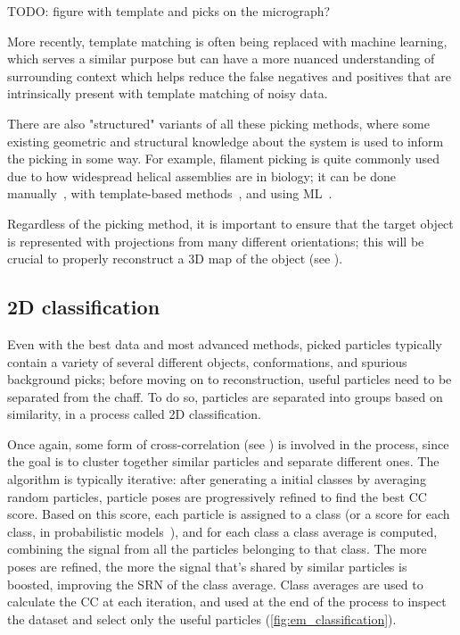 TODO: figure with template and picks on the micrograph?

More recently, template matching is often being replaced with machine learning, which serves a similar purpose but can have a more nuanced understanding of surrounding context which helps reduce the false negatives and positives that are intrinsically present with template matching of noisy data.

There are also "structured" variants of all these picking methods, where some existing geometric and structural knowledge about the system is used to inform the picking in some way.
For example, filament picking is quite commonly used due to how widespread helical assemblies are in biology; it can be done manually~\cite{scheresRELIONImplementationBayesian2012,heHelicalReconstructionRELION2017}, with template-based methods~\cite{punjaniCryoSPARCAlgorithmsRapid2017}, and using ML~\cite{wagnerSPHIREcrYOLOFastAccurate2019,wagnerEvolutionSPHIREcrYOLOParticle2020}.

Regardless of the picking method, it is important to ensure that the target object is represented with projections from many different orientations; this will be crucial to properly reconstruct a 3D map of the object (see ).

\subsection{2D classification}\label{em_classification}

Even with the best data and most advanced methods, picked particles typically contain a variety of several different objects, conformations, and spurious background picks; before moving on to reconstruction, useful particles need to be separated from the chaff.
To do so, particles are separated into groups based on similarity, in a process called 2D classification.

Once again, some form of cross-correlation (see ) is involved in the process, since the goal is to cluster together similar particles and separate different ones.
The algorithm is typically iterative: after generating a initial classes by averaging random particles, particle poses are progressively refined to find the best CC score.
Based on this score, each particle is assigned to a class (or a score for each class, in probabilistic models~\cite{scheresRELIONImplementationBayesian2012}), and for each class a class average is computed, combining the signal from all the particles belonging to that class. The more poses are refined, the more the signal that's shared by similar particles is boosted, improving the SRN of the class average.
Class averages are used to calculate the CC at each iteration, and used at the end of the process to inspect the dataset and select only the useful particles (\autoref{fig:em_classification}).

